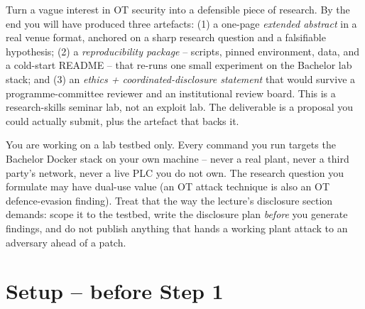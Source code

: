 \documentclass[11pt,a4paper]{article}
\begin{document}
\labheader

\begin{goalbox}
Turn a vague interest in OT security into a defensible piece of research. By the end you will have produced three artefacts: (1) a one-page \emph{extended abstract} in a real venue format, anchored on a sharp research question and a falsifiable hypothesis; (2) a \emph{reproducibility package} -- scripts, pinned environment, data, and a cold-start README -- that re-runs one small experiment on the Bachelor lab stack; and (3) an \emph{ethics + coordinated-disclosure statement} that would survive a programme-committee reviewer and an institutional review board. This is a research-skills seminar lab, not an exploit lab. The deliverable is a proposal you could actually submit, plus the artefact that backs it.
\end{goalbox}

\begin{warnbox}
You are working on a lab testbed only. Every command you run targets the Bachelor Docker stack on your own machine -- never a real plant, never a third party's network, never a live PLC you do not own. The research question you formulate may have dual-use value (an OT attack technique is also an OT defence-evasion finding). Treat that the way the lecture's disclosure section demands: scope it to the testbed, write the disclosure plan \emph{before} you generate findings, and do not publish anything that hands a working plant attack to an adversary ahead of a patch.
\end{warnbox}

\section*{Setup -- before Step 1}
\end{document}
